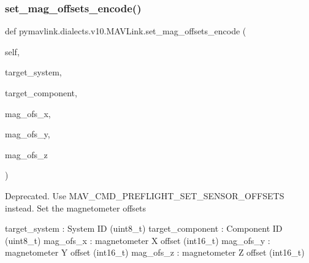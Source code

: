 \begin{DoxyVerb}
\begin{DoxyVerb}
\begin{DoxyVerb}
\begin{DoxyVerb}
\begin{DoxyVerb}
\begin{DoxyVerb}
\begin{DoxyVerb}
\begin{DoxyVerb}
\begin{DoxyVerb}
\begin{DoxyVerb}
\subsubsection{\texorpdfstring{set\+\_\+mag\+\_\+offsets\+\_\+encode()}{set\_mag\_offsets\_encode()}}
{\footnotesize\ttfamily def pymavlink.\+dialects.\+v10.\+M\+A\+V\+Link.\+set\+\_\+mag\+\_\+offsets\+\_\+encode (\begin{DoxyParamCaption}\item[{}]{self,  }\item[{}]{target\+\_\+system,  }\item[{}]{target\+\_\+component,  }\item[{}]{mag\+\_\+ofs\+\_\+x,  }\item[{}]{mag\+\_\+ofs\+\_\+y,  }\item[{}]{mag\+\_\+ofs\+\_\+z }\end{DoxyParamCaption})}

\begin{DoxyVerb}Deprecated. Use MAV_CMD_PREFLIGHT_SET_SENSOR_OFFSETS instead. Set the
magnetometer offsets

target_system             : System ID (uint8_t)
target_component          : Component ID (uint8_t)
mag_ofs_x                 : magnetometer X offset (int16_t)
mag_ofs_y                 : magnetometer Y offset (int16_t)
mag_ofs_z                 : magnetometer Z offset (int16_t)\end{DoxyVerb}
 \mbox{\label{classpymavlink_1_1dialects_1_1v10_1_1MAVLink_a81ec1e7917f4024ea60b66c5ee69411e}} 

\end{DoxyVerb}
\end{DoxyVerb}
\end{DoxyVerb}
\end{DoxyVerb}
\end{DoxyVerb}
\end{DoxyVerb}
\end{DoxyVerb}
\end{DoxyVerb}
\end{DoxyVerb}
\end{DoxyVerb}
